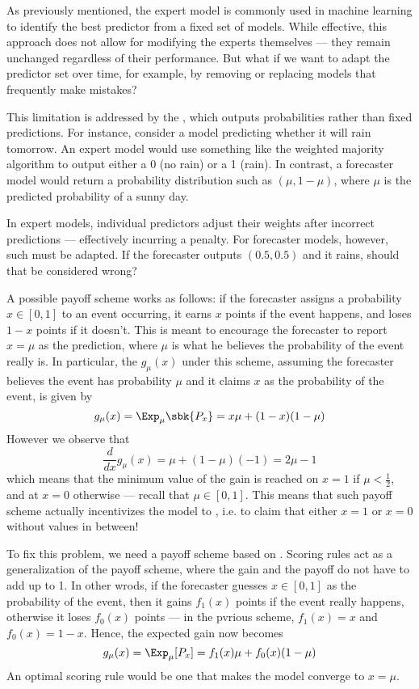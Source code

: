 \documentclass[a4paper, 12pt]{report}
\begin{document}
    As previously mentioned, the expert model is commonly used in machine learning to identify the best predictor from a fixed set of models. While effective, this approach does not allow for modifying the experts themselves --- they remain unchanged regardless of their performance. But what if we want to adapt the predictor set over time, for example, by removing or replacing models that frequently make mistakes?

    This limitation is addressed by the , which outputs probabilities rather than fixed predictions. For instance, consider a model predicting whether it will rain tomorrow. An expert model would use something like the weighted majority algorithm to output either a 0 (no rain) or a 1 (rain). In contrast, a forecaster model would return a probability distribution such as $(\mu , 1 - \mu)$, where $\mu$ is the predicted probability of a sunny day.

    In expert models, individual predictors adjust their weights after incorrect predictions --- effectively incurring  a penalty. For forecaster models, however, such  must be adapted. If the forecaster outputs $(0.5, 0.5)$ and it rains, should that be considered wrong?

    A possible payoff scheme works as follows: if the forecaster assigns a probability $x \in [0,1]$ to an event occurring, it earns $x$ points if the event happens, and loses $1 - x$ points if it doesn't. This is meant to encourage the forecaster to report $x = \mu$ as the prediction, where $\mu$ is what he believes the probability of the event really is. In particular, the  $g_\mu(x)$ under this scheme, assuming the forecaster believes the event has probability $\mu$ and it claims $x$ as the probability of the event, is given by $$g_\mu(x) = \Exp_\mu \sbk{P_x} = x \mu + (1 -x )(1 - \mu)$$ However we observe that $$\dfrac{d}{dx}g_\mu(x) = \mu + (1 - \mu)(-1) = 2\mu - 1$$ which means that the minimum value of the gain is reached on $x = 1$ if $\mu < \tfrac{1}{2}$, and at $x = 0$ otherwise --- recall that $\mu \in [0, 1]$. This means that such payoff scheme actually incentivizes the model to , i.e. to claim that either $x = 1$ or $x = 0$ without values in between!

    To fix this problem, we need a payoff scheme based on . Scoring rules act as a generalization of the payoff scheme, where the gain and the payoff do not have to add up to 1. In other wrods, if the forecaster guesses $x \in [0, 1]$ as the probability of the event, then it gains $f_1(x)$ points if the event really happens, otherwise it loses $f_0(x)$ points --- in the pvrious scheme, $f_1(x) = x$ and $f_0(x) = 1- x$. Hence, the expected gain now becomes $$g_\mu(x) = \Exp_\mu[P_x] = f_1(x) \mu + f_0(x)(1 - \mu)$$ An optimal scoring rule would be one that makes the model converge to $x = \mu$.
\end{document}
